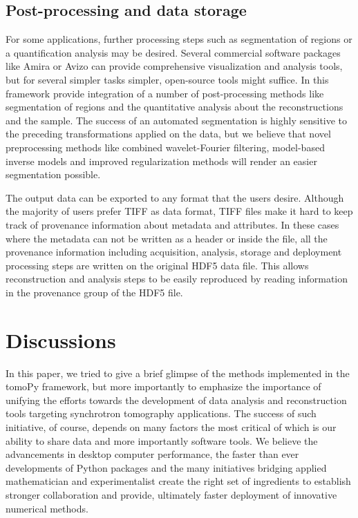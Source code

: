 \documentclass[pdf]{iucr}              %
\begin{document}
\subsection{Post-processing and data storage}

For some applications, further processing steps such as segmentation of regions or a quantification analysis may be desired. Several commercial software packages like Amira or Avizo \cite{amira_avizo} can provide comprehensive visualization and analysis tools, but for several simpler tasks simpler, open-source tools might suffice. In this framework provide integration of a number of post-processing methods \cite{scikit} like segmentation of regions and  the quantitative analysis about the reconstructions and the sample. The success of an automated segmentation is highly sensitive to the preceding transformations applied on the data, but we believe that novel preprocessing methods like combined wavelet-Fourier filtering, model-based inverse models and improved regularization methods will render an easier segmentation possible. 

The output data can be exported to any format that the users desire. Although the majority of users prefer TIFF as data format, TIFF files make it hard to keep track of provenance information about metadata and attributes. In these cases where the metadata can not be written as a header or inside the file, all the provenance information including acquisition, analysis, storage and deployment processing steps are written on the original HDF5 data file. This allows reconstruction and analysis steps to be easily reproduced by reading information in the provenance group of the HDF5 file. 


\section{Discussions}

In this paper, we tried to give a brief glimpse of the methods implemented in the tomoPy framework, but more importantly to emphasize the importance of unifying the efforts towards the development of data analysis and reconstruction tools targeting synchrotron tomography applications. The success of such initiative, of course, depends on many factors the most critical of which is our ability to share data and more importantly software tools. We believe the advancements in desktop computer performance, the faster than ever developments of Python packages and the many initiatives bridging applied mathematician and experimentalist create the right set of ingredients to establish stronger collaboration and provide, ultimately faster deployment of innovative numerical methods.
\end{document}

